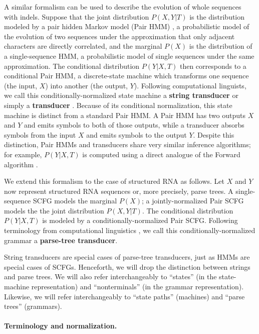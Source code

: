 \documentclass[10pt]{article}
\begin{document}
A similar formalism can be used to describe the evolution of whole
sequences with indels.
Suppose that the joint distribution $P (X, Y | T)$ is the distribution
modeled by a pair hidden Markov model (Pair HMM) \cite{Durbin98},
a probabilistic model of the evolution of two sequences under the
approximation that only adjacent characters are directly correlated,
and the marginal $P(X)$ is the distribution of a single-sequence HMM,
a probabilistic model of single sequences under the same approximation.
The conditional distribution $P(Y | X, T)$ then corresponds to a conditional Pair HMM,
a discrete-state machine which transforms one sequence (the input, $X$) into another (the output, $Y$).
Following computational linguists, we call this conditionally-normalized state machine a
 {\bf string transducer} or simply a {\bf transducer}
\cite{BradleyHolmes2007}.
Because of its conditional normalization, this state machine is
distinct from a standard Pair HMM.
A Pair HMM has two outputs $X$ and $Y$ and emits symbols to both of those outputs,
while a transducer absorbs symbols from the input $X$ and emits
symbols to the output $Y$.
Despite this distinction, Pair HMMs and transducers share very similar inference algorithms;
for example, $P(Y | X, T)$ is computed using a direct analogue of the Forward algorithm \cite{Durbin98}.

We extend this formalism to the case of structured RNA as follows.
Let $X$ and $Y$ now represent structured RNA sequences or, more
precisely, parse trees.
A single-sequence SCFG models the marginal $P(X)$;
a jointly-normalized Pair SCFG \cite{Durbin98} models the the joint distribution $P (X, Y | T)$.
The conditional distribution $P(Y | X, T)$ is modeled by a conditionally-normalized Pair SCFG.
Following terminology from computational linguistics
\cite{ComonEtAl2007-TreeTransducers}, we call this
conditionally-normalized grammar a {\bf parse-tree transducer}.

String transducers are special cases of parse-tree transducers, just
as HMMs are special cases of SCFGs.
Henceforth, we will drop the distinction between strings and parse trees.
We will also refer interchangeably to ``states'' (in the state-machine representation)
and ``nonterminals'' (in the grammar representation).
Likewise, we will refer interchangeably to ``state paths'' (machines) and ``parse trees'' (grammars).


\paragraph{Terminology and normalization.}
\end{document}
